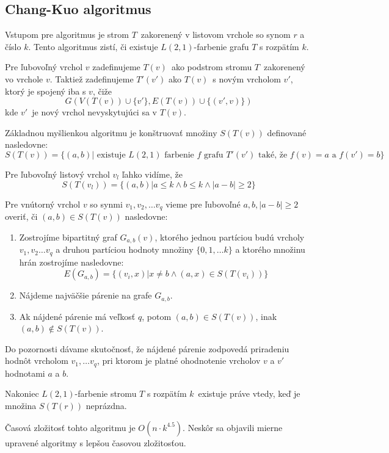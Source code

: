 \subsection{Chang-Kuo algoritmus}

Vstupom pre algoritmus je strom $T$ zakorenený v listovom vrchole so synom $r$ a číslo $k$.
Tento algoritmus zistí, či existuje $L(2,1)$-farbenie grafu $T$ s rozpätím $k$.

Pre ľubovoľný
vrchol $v$ zadefinujeme $T(v)$ ako podstrom stromu $T$ zakorenený vo vrchole $v$. Taktiež
zadefinujeme $T'(v')$ ako $T(v)$ s novým vrcholom $v'$, ktorý je spojený iba s $v$, čiže
$$ G\left(V(T(v)) \cup \{ v' \}, E(T(v)) \cup \{ (v', v)\} \right) $$
kde $v'$ je nový vrchol nevyskytujúci sa v $T(v)$.

Základnou myšlienkou algoritmu je konštruovať množiny $S(T(v))$ definované nasledovne:
$$S(T(v)) = \{ (a, b) | \textrm{ existuje } L(2,1) \textrm{ farbenie } f \textrm{ grafu } T'(v') \textrm{ také, že } f(v) = a \textrm{ a } f(v') = b\}$$

Pre ľubovoľný listový vrchol $v_l$ ľahko vidíme, že 
$$S(T(v_l)) = \{ (a, b) | a \leq k \wedge b \leq k \wedge |a - b| \ge 2\}$$

Pre vnútorný vrchol $v$ so synmi $v_1, v_2, \ldots v_q$ vieme pre ľubovoľné $a, b, |a - b| \ge 2$ overiť,
či $(a, b) \in S(T(v))$ nasledovne:

\begin{enumerate}
    \item Zostrojíme bipartitný graf $G_{a,b}(v)$, ktorého jednou partíciou budú vrcholy $v_1, v_2 \ldots v_q$ a
    druhou partíciou hodnoty množiny $\{0, 1, \ldots k\}$ a ktorého množinu hrán zostrojíme nasledovne:
    $$E(G_{a,b}) = \{ (v_i, x) | x \neq b \wedge (a, x) \in S(T(v_i))\}$$
    \item Nájdeme najväčšie párenie na grafe $G_{a,b}$.
    \item Ak nájdené párenie má veľkosť $q$, potom $(a,b) \in S(T(v))$, inak $(a,b) \notin S(T(v))$.
\end{enumerate}

Do pozornosti dávame skutočnosť, že nájdené párenie zodpovedá priradeniu hodnôt vrcholom
$v_1, \ldots v_q$, pri ktorom je platné ohodnotenie vrcholov $v$ a $v'$ hodnotami $a$ a $b$.

Nakoniec $L(2,1)$-farbenie stromu $T$ s rozpätím $k$ existuje práve vtedy, keď je množina
$S(T(r))$ neprázdna.

Časová zložitosť tohto algoritmu je $O(n \cdot k^{4.5})$\cite{chang_kuo}. Neskôr sa objavili
mierne upravené algoritmy s lepšou časovou zložitosťou.

